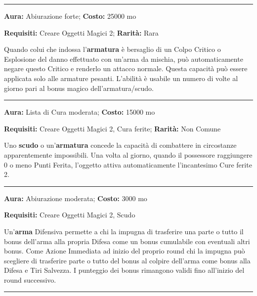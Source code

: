 \begin{multicols}{2}
\smallskip\noindent\rule{\linewidth}{2pt}  \hypertarget{Denegante}{}\smallskip{}\noindent\label{Denegante}

\textbf{Aura:} Abiurazione forte; \textbf{Costo:} 25000 mo

\textbf{Requisiti:} Creare Oggetti Magici 2; \textbf{Rarità:} Rara

Quando colui che indossa l'\textbf{armatura} è bersaglio di un Colpo Critico o Esplosione del danno effettuato con un'arma da mischia, può automaticamente negare questo Critico e renderlo un attacco normale. Questa capacità può essere applicata solo alle armature pesanti. L'abilità è usabile un numero di volte al giorno pari al bonus magico dell'armatura/scudo.

\smallskip\noindent\rule{\linewidth}{2pt}  \hypertarget{Determinazione}{}\smallskip{}\noindent\label{Determinazione}

\textbf{Aura:} Lista di Cura moderata; \textbf{Costo:} 15000 mo

\textbf{Requisiti:} Creare Oggetti Magici 2, Cura ferite; \textbf{Rarità:} Non Comune

Uno \textbf{scudo} o un'\textbf{armatura} concede la capacità di combattere in circostanze apparentemente impossibili. Una volta al giorno, quando il possessore raggiungere 0 o meno Punti Ferita, l'oggetto attiva automaticamente l'incantesimo Cure ferite 2.

\smallskip\noindent\rule{\linewidth}{2pt}  \hypertarget{Difensiva}{}\smallskip{}\noindent\label{Difensiva}

\textbf{Aura:} Abiurazione moderata; \textbf{Costo:} 3000 mo

\textbf{Requisiti:} Creare Oggetti Magici 2, Scudo

Un'\textbf{arma} Difensiva permette a chi la impugna di trasferire una parte o tutto il bonus dell'arma alla propria Difesa come un bonus cumulabile con eventuali altri bonus. Come Azione Immediata ad inizio del proprio round chi la impugna può scegliere di trasferire parte o tutto del bonus al colpire dell'arma come bonus alla Difesa e Tiri Salvezza. I punteggio dei bonus rimangono validi fino all'inizio del round successivo.

\smallskip\noindent\rule{\linewidth}{2pt}  \hypertarget{DifesadagliIncantesimi}{}\smallskip{}\noindent\label{DifesadagliIncantesimi}


\end{multicols}

